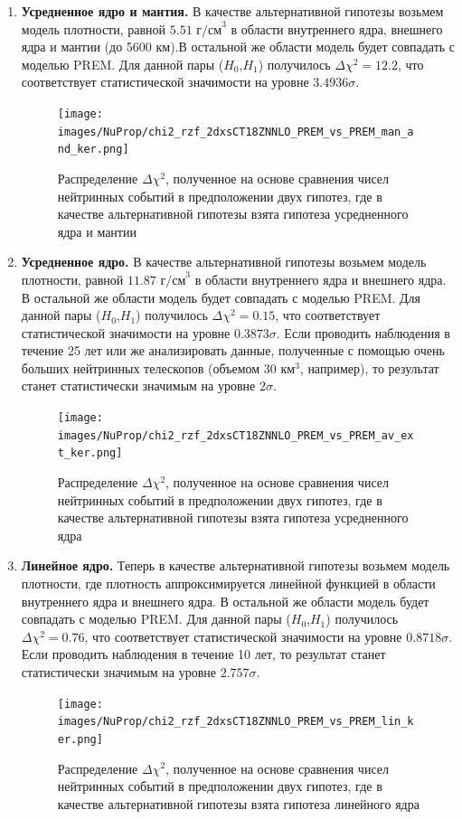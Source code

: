 \begin{enumerate}
    \item \textbf{Усредненное ядро и мантия.} В качестве альтернативной гипотезы возьмем модель плотности, равной $5.51\text{ г/см}^3$ в области внутреннего ядра, внешнего ядра и мантии (до 5600 км).В остальной же области модель будет совпадать с моделью PREM. Для данной пары ($H_0$,$H_1$) получилось $\Delta\chi^2 = 12.2$, что соответствует статистической значимости на уровне $3.4936\sigma$.   
    \begin{figure}[!h]
    \centering
    \texttt{[image: images/NuProp/chi2\_rzf\_2dxsCT18ZNNLO\_PREM\_vs\_PREM\_man\_and\_ker.png]}
    \caption{Распределение $\Delta\chi^2$, полученное на основе сравнения чисел нейтринных событий в предположении двух гипотез, где в качестве альтернативной гипотезы взята гипотеза усредненного ядра и мантии}
    \label{NuTom1}
    \end{figure}
    \item \textbf{Усредненное ядро.} В качестве альтернативной гипотезы возьмем модель плотности, равной $11.87\text{ г/см}^3$ в области внутреннего ядра и внешнего ядра. В остальной же области модель будет совпадать с моделью PREM. Для данной пары ($H_0$,$H_1$) получилось $\Delta\chi^2 = 0.15$, что соответствует статистической значимости на уровне $0.3873\sigma$. Если проводить наблюдения в течение 25 лет или же анализировать данные, полученные с помощью очень больших нейтринных телескопов (объемом $30 \text{ км}^3$, например), то результат станет статистически значимым на уровне $2\sigma$.   
    \begin{figure}[!h]
    \centering
    \texttt{[image: images/NuProp/chi2\_rzf\_2dxsCT18ZNNLO\_PREM\_vs\_PREM\_av\_ext\_ker.png]}
    \caption{Распределение $\Delta\chi^2$, полученное на основе сравнения чисел нейтринных событий в предположении двух гипотез, где в качестве альтернативной гипотезы взята гипотеза усредненного ядра}
    \label{NuTom2}
    \end{figure}
    \item \textbf{Линейное ядро.} Теперь в качестве альтернативной гипотезы возьмем модель плотности,  где плотность аппроксимируется линейной функцией в области внутреннего ядра и внешнего ядра. В остальной же области модель будет совпадать с моделью PREM. Для данной пары ($H_0$,$H_1$) получилось $\Delta\chi^2 = 0.76$, что соответствует статистической значимости на уровне $0.8718\sigma$. Если проводить наблюдения в течение 10 лет, то результат станет статистически значимым на уровне $2.757\sigma$. 
    \begin{figure}[!h]
    \centering
    \texttt{[image: images/NuProp/chi2\_rzf\_2dxsCT18ZNNLO\_PREM\_vs\_PREM\_lin\_ker.png]}
    \caption{Распределение $\Delta\chi^2$, полученное на основе сравнения чисел нейтринных событий в предположении двух гипотез, где в качестве альтернативной гипотезы взята гипотеза линейного ядра}
    \label{NuTom3}
    \end{figure}
\end{enumerate}
